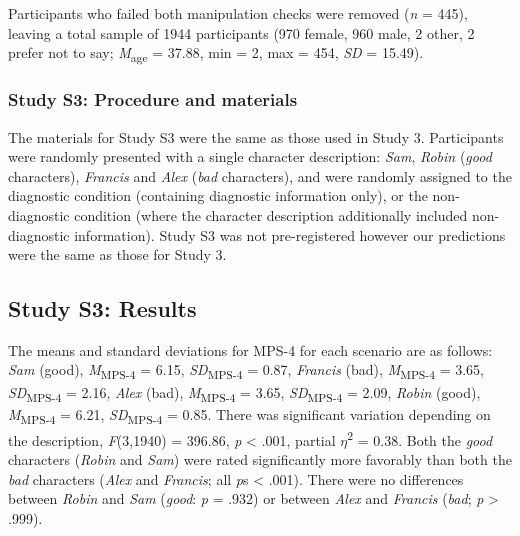 \documentclass[
  man,floatsintext]{apa6}
\begin{document}
Participants who failed both manipulation checks were removed (\emph{n} = 445), leaving a total sample of 1944 participants (970 female, 960 male, 2 other, 2 prefer not to say; \emph{M}\textsubscript{age} = 37.88, min = 2, max = 454, \emph{SD} = 15.49).

\subsubsection{Study S3: Procedure and materials}\label{study-s3-procedure-and-materials}

The materials for Study S3 were the same as those used in Study 3. Participants were randomly presented with a single character description: \emph{Sam}, \emph{Robin} (\emph{good} characters), \emph{Francis} and \emph{Alex} (\emph{bad} characters), and were randomly assigned to the diagnostic condition (containing diagnostic information only), or the non-diagnostic condition (where the character description additionally included non-diagnostic information). Study S3 was not pre-registered however our predictions were the same as those for Study 3.

\subsection{Study S3: Results}\label{study-s3-results}

The means and standard deviations for MPS-4 for each scenario are as follows:
\emph{Sam} (good),
\emph{M}\textsubscript{MPS-4} = 6.15, \emph{SD}\textsubscript{MPS-4} = 0.87,
\emph{Francis} (bad),
\emph{M}\textsubscript{MPS-4} = 3.65, \emph{SD}\textsubscript{MPS-4} = 2.16,
\emph{Alex} (bad),
\emph{M}\textsubscript{MPS-4} = 3.65, \emph{SD}\textsubscript{MPS-4} = 2.09,
\emph{Robin} (good),
\emph{M}\textsubscript{MPS-4} = 6.21, \emph{SD}\textsubscript{MPS-4} = 0.85. There was significant variation depending on the description, \emph{F}(3,1940) = 396.86, \emph{p} \textless{} .001, partial \(\eta\)\textsuperscript{2} = 0.38. Both the \emph{good} characters (\emph{Robin} and \emph{Sam}) were rated significantly more favorably than both the \emph{bad} characters (\emph{Alex} and \emph{Francis}; all \emph{p}s \textless{} .001). There were no differences between \emph{Robin} and \emph{Sam} (\emph{good}: \emph{p} = .932) or between \emph{Alex} and \emph{Francis} (\emph{bad}; \emph{p} \textgreater{} .999).
\end{document}
